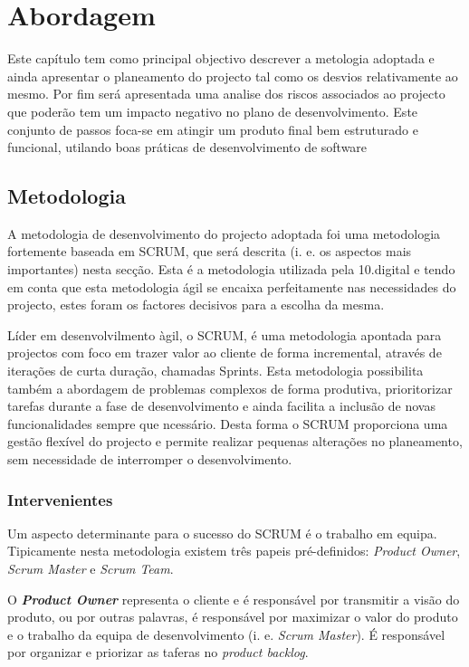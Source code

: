 \chapter{Abordagem}
\label{sec:abordagem}

Este capítulo tem como principal objectivo descrever a metologia adoptada e ainda apresentar o planeamento do projecto tal como os desvios relativamente ao mesmo. Por fim será apresentada uma analise dos riscos associados ao projecto que poderão tem um impacto negativo no plano de desenvolvimento. Este conjunto de passos foca-se em atingir um produto final bem estruturado e funcional, utilando boas práticas de desenvolvimento de software


\section{Metodologia}
\label{metodologia}

A metodologia de desenvolvimento do projecto adoptada foi uma metodologia fortemente baseada em SCRUM\cite{scrum}, que será descrita (i. e. os aspectos mais importantes) nesta secção. Esta é a metodologia utilizada pela 10.digital e tendo em conta que esta metodologia ágil se encaixa perfeitamente nas necessidades do projecto, estes foram os factores decisivos para a escolha da mesma. 

Líder em desenvolvilmento àgil, o SCRUM, é uma metodologia apontada para projectos com foco em trazer valor ao cliente de forma incremental, através de iterações de curta duração, chamadas Sprints. Esta metodologia possibilita também a abordagem de problemas complexos de forma produtiva, prioritorizar tarefas durante a fase de desenvolvimento e ainda facilita a inclusão de novas funcionalidades sempre que ncessário. Desta forma o SCRUM proporciona uma gestão flexível do projecto e permite realizar pequenas alterações no planeamento, sem necessidade de interromper o desenvolvimento.

\subsection{Intervenientes}

Um aspecto determinante para o sucesso do SCRUM é o trabalho em equipa. Tipicamente nesta metodologia existem três papeis pré-definidos: \textit{Product Owner}, \textit{Scrum Master} e \textit{Scrum Team}.

O \textbf{\textit{Product Owner}} representa o cliente e é responsável por transmitir a visão do produto, ou por outras palavras, é responsável por maximizar o valor do produto e o trabalho da equipa de desenvolvimento (i. e. \textit{Scrum Master}). É responsável por organizar e priorizar as taferas no \textit{product backlog}.

